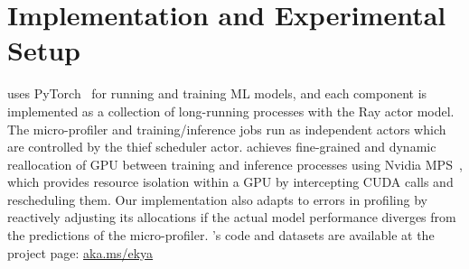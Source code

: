\section{Implementation and Experimental Setup}
\label{subsec:eval-setup}


\name uses PyTorch~\cite{pytorch} for running and training ML models, and each component is implemented as a collection of long-running processes with the Ray\cite{ray} actor model. The micro-profiler and training/inference jobs run as independent actors which are controlled by the thief scheduler actor. \name achieves fine-grained and dynamic reallocation of GPU between training and inference processes using Nvidia MPS~\cite{nvidia-mps}, which provides resource isolation within a GPU by intercepting CUDA calls and rescheduling them. Our implementation also adapts to errors in profiling by reactively adjusting its allocations if the actual model performance diverges from the predictions of the micro-profiler. \name's code and datasets are available at the project page: \href{https://aka.ms/ekya}{aka.ms/ekya}

